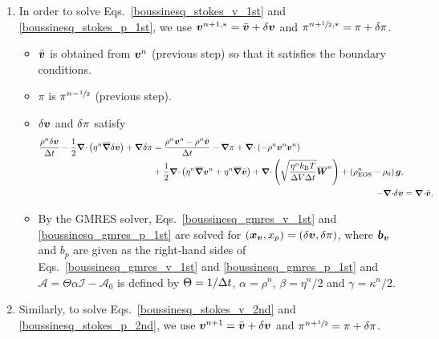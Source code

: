\documentclass[
10pt
showpacs, showkeys,
amsmath,amssymb,
aps,
pre,
floatfix,
]{revtex4-1}
\newcommand{\divg}{{\V\nabla\cdot}}                       %
\begin{document}
\begin{enumerate}

\item In order to solve Eqs.~\eqref{boussinesq_stokes_v_1st} and \eqref{boussinesq_stokes_p_1st}, we use $\boldsymbol{v}^{n+1,*}=\bar{\boldsymbol{v}}+\delta\boldsymbol{v}$ and $\pi^{n+\sfrac{1}{2},*}=\pi+\delta\pi$.

\begin{itemize}
\item $\bar{\boldsymbol{v}}$ is obtained from $\boldsymbol{v}^n$ (previous step) so that it satisfies the boundary conditions.
\item $\pi$ is $\pi^{n-\sfrac{1}{2}}$ (previous step).
\item $\delta\boldsymbol{v}$ and $\delta\pi$ satisfy
\begin{align}
\label{boussinesq_gmres_v_1st}
\begin{split}
\frac{\rho^n\d{\V{v}}}{\D{t}} - \frac{1}{2}\divg\left(\eta^n\overline{\grad}\d{\V{v}}\right) + \grad\d{\pi}
& = \frac{\rho^n\V{v}^n-\rho^n\bar{\V{v}}}{\D{t}} - \grad\pi 
+ \divg\left(-\rho^n\V{v}^n\V{v}^n\right) \\
& + \frac{1}{2}\divg\left( \eta^n\overline{\grad}\V{v}^n + \eta^n\overline{\grad}\bar{\V{v}} \right)
+ \divg\left( \sqrt{\frac{\eta^n k_\mathrm{B}T}{\D{V}\D{t}} } \overline{\V{W}}^n \right) + \left(\rho^n_\mathrm{EOS}-\rho_0\right)\V{g},
\end{split} \\
\label{boussinesq_gmres_p_1st}
-\divg\d{\V{v}} &= \divg\bar{\V{v}}.
\end{align}
\item By the GMRES solver, Eqs.~\eqref{boussinesq_gmres_v_1st} and \eqref{boussinesq_gmres_p_1st} are solved for $(\boldsymbol{x}_{\boldsymbol{v}},x_p)=(\delta\boldsymbol{v},\delta\pi)$, where $\boldsymbol{b}_{\boldsymbol{v}}$ and $b_p$ are given as the right-hand sides of Eqs.~\eqref{boussinesq_gmres_v_1st} and \eqref{boussinesq_gmres_p_1st} and $\mathcal{A}=\Theta\alpha\mathcal{I}-\mathcal{A}_0$ is defined by $\Theta=1/\Delta t$, $\alpha=\rho^n$, $\beta=\eta^n/2$ and $\gamma=\kappa^n/2$.
\end{itemize}

\item Similarly, to solve Eqs.~\eqref{boussinesq_stokes_v_2nd} and \eqref{boussinesq_stokes_p_2nd}, we use $\boldsymbol{v}^{n+1}=\bar{\boldsymbol{v}}+\delta\boldsymbol{v}$ and $\pi^{n+\sfrac{1}{2}}=\pi+\delta\pi$.


\end{enumerate}
\end{document}
